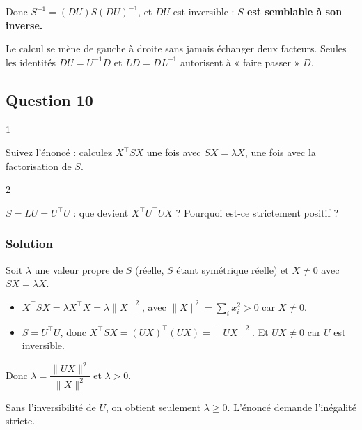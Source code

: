 \documentclass[11pt,a4paper]{article}
\providecommand{\tightlist}{\setlength{\itemsep}{0pt}\setlength{\parskip}{0pt}}
\begin{document}
Donc \(\boxed{S^{-1}=(DU)S(DU)^{-1}}\), et \(DU\) est inversible : \textbf{\(S\) est semblable à son inverse.}

\begin{piege}

Le calcul se mène de gauche à droite sans jamais échanger deux facteurs. Seules les identités \(DU=U^{-1}D\) et \(LD=DL^{-1}\) autorisent à « faire passer » \(D\).

\end{piege}

\hypertarget{question-10}{%
\subsection{Question 10}\label{question-10}}

\begin{indication}{1}

Suivez l'énoncé : calculez \(X^\top SX\) une fois avec \(SX=\lambda X\), une fois avec la factorisation de \(S\).

\end{indication}

\begin{indication}{2}

\(S=LU=U^\top U\) : que devient \(X^\top U^\top UX\) ? Pourquoi est-ce strictement positif ?

\end{indication}

\hypertarget{solution-9}{%
\subsubsection{Solution}\label{solution-9}}

Soit \(\lambda\) une valeur propre de \(S\) (réelle, \(S\) étant symétrique réelle) et \(X\neq0\) avec \(SX=\lambda X\).

\begin{itemize}
\tightlist
\item
  \(X^\top SX=\lambda X^\top X=\lambda\|X\|^2\), avec \(\|X\|^2=\sum_ix_i^2>0\) car \(X\neq0\).
\item
  \(S=U^\top U\), donc \(X^\top SX=(UX)^\top(UX)=\|UX\|^2\). Et \(UX\neq0\) car \(U\) est inversible.
\end{itemize}

Donc \(\lambda=\dfrac{\|UX\|^2}{\|X\|^2}\) et \(\boxed{\lambda>0}\).

\begin{piege}

Sans l'inversibilité de \(U\), on obtient seulement \(\lambda\ge0\). L'énoncé demande l'inégalité stricte.

\end{piege}
\end{document}
